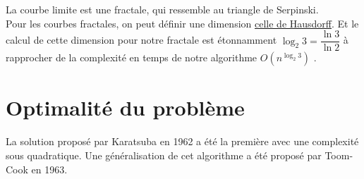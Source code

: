 \documentclass[11pt,french]{article}
\theoremstyle{plain}
\newtheorem*{proof}{Preuve}
\begin{document}
La courbe limite est une fractale, qui ressemble au  triangle de Serpinski. \\Pour les courbes fractales, on peut définir une dimension  \href{https://fr.wikipedia.org/wiki/Dimension_de_Hausdorff}{celle de Hausdorff}. Et le calcul de cette dimension pour notre fractale est étonnamment  $\log_2{3}=\dfrac{\ln 3}{\ln 2}$ à rapprocher de la complexité en temps de notre algorithme  $O(n^{\log_2{3}})$ .
%
%
%
%


\section{Optimalité du problème}

La solution proposé par Karatsuba en 1962 a été la première avec une complexité sous quadratique. Une généralisation de cet algorithme a été proposé par Toom-Cook en 1963.
\end{document}
